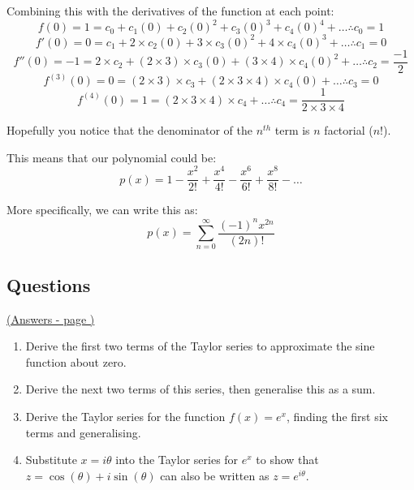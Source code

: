 \documentclass[../main.tex]{subfiles}
\begin{document}
Combining this with the derivatives of the function at each point:
\[f(0) = 1 = c_0 + c_1(0) + c_2(0)^2 + c_3(0)^3 + c_4(0)^4 + \dots \therefore c_0 = 1\]
\[f'(0) = 0 = c_1 + 2\times c_2(0) + 3\times c_3(0)^2 + 4\times c_4(0)^3 + \dots \therefore c_1 = 0\]
\[f''(0) = -1 = 2\times c_2 + (2\times 3)\times c_3(0) + (3\times 4)\times c_4(0)^2 + \dots \therefore c_2 = \frac{-1}{2}\]
\[f^{(3)}(0) = 0 = (2\times 3)\times c_3 + (2\times 3\times 4)\times c_4(0) + \dots \therefore c_3 = 0\]
\[f^{(4)}(0) = 1 = (2\times 3\times 4)\times c_4 + \dots \therefore c_4 = \frac{1}{2\times 3\times 4}\]

Hopefully you notice that the denominator of the $n^{th}$ term is $n$ factorial ($n!$).

This means that our polynomial could be:
\[p(x) = 1 - \frac{x^2}{2!} +\frac{x^4}{4!} - \frac{x^6}{6!} + \frac{x^8}{8!} - \dots\]

More specifically, we can write this as:
\[p(x) = \sum_{n=0}^{\infty} \frac{(-1)^{n}x^{2n}}{(2n)!}\]


\pagebreak
\hypertarget{taylorserieslink}{\subsection*{Questions}}
\hyperlink{taylorseriesanswers}{(Answers - page {\pageref*{Taylor series answers}})}

\label{taylor series}
\begin{enumerate}[itemsep=1cm]
    \item 
    Derive the first two terms of the Taylor series to approximate the sine function about zero.

    \item 
    Derive the next two terms of this series, then generalise this as a sum.

    \item
    Derive the Taylor series for the function $f(x)=e^x$, finding the first six terms and generalising.

    \item
    Substitute $x=i\theta$ into the Taylor series for $e^x$ to show that $z=\cos{(\theta)}+i \sin{(\theta)}$ can also be written as $z=e^{i \theta}$.

    
\end{enumerate}
\end{document}
